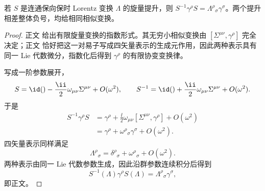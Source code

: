 \begin{proposition}
若 $S$ 是连通保向保时 Lorentz 变换 $\Lambda$ 的旋量提升，则 $S^{-1}\gamma^\rho S=\Lambda^\rho{}_\sigma\gamma^\sigma$。两个提升相差整体负号，均给相同相似变换。
\end{proposition}
\begin{proof}
正文 给出有限旋量变换的指数形式。其无穷小相似变换由 $[\Sigma^{\mu\nu},\gamma^\rho]$ 完全决定；正文 恰好把这一对易子写成四矢量表示的生成元作用，因此两种表示具有同一 Lie 代数微分，指数化后得到 $\gamma^\rho$ 的有限协变变换律。

写成一阶参数展开，
\begin{equation*}
 S=\id()-\frac{\ii}{2}\omega_{\mu\nu}\Sigma^{\mu\nu}+O(\omega^2),
 \qquad
 S^{-1}=\id()+\frac{\ii}{2}\omega_{\mu\nu}\Sigma^{\mu\nu}+O(\omega^2).
\end{equation*}
于是
\begin{align*}
 S^{-1}\gamma^\rho S
 &=\gamma^\rho+\frac{\ii}{2}\omega_{\mu\nu}
 [\Sigma^{\mu\nu},\gamma^\rho]+O(\omega^2)\\
 &=\gamma^\rho+\omega^\rho{}_{\sigma}\gamma^\sigma+O(\omega^2).
\end{align*}
四矢量表示同样满足
\begin{equation*}
 \Lambda^\rho{}_{\sigma}
 =\delta^\rho{}_{\sigma}+\omega^\rho{}_{\sigma}+O(\omega^2).
\end{equation*}
两种表示由同一 Lie 代数参数生成，因此沿群参数连续积分后得到
\begin{equation*}
 S^{-1}(\Lambda)\gamma^\rho S(\Lambda)
 =\Lambda^\rho{}_{\sigma}\gamma^\sigma,
\end{equation*}
即正文。
\end{proof}


